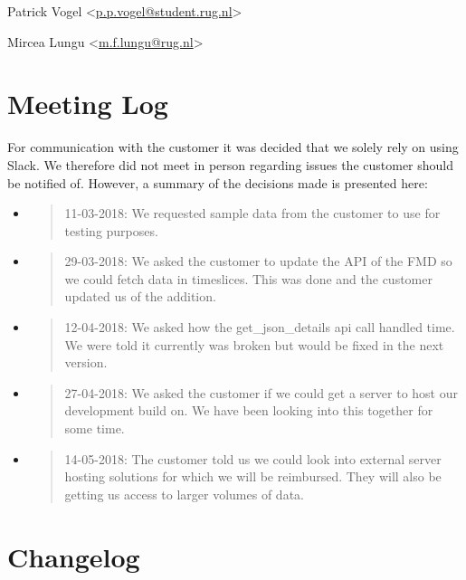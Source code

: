 Patrick Vogel
\textless{}\href{mailto:p.p.vogel@student.rug.nl}{{p.p.vogel@student.rug.nl}}\textgreater{}

Mircea Lungu
\textless{}\href{mailto:m.f.lungu@rug.nl}{{m.f.lungu@rug.nl}}\textgreater{}

\hypertarget{meeting-log}{%
\section{Meeting Log}\label{meeting-log}}

For communication with the customer it was decided that we solely rely
on using Slack. We therefore did not meet in person regarding issues the
customer should be notified of. However, a summary of the decisions made
is presented here:

\begin{itemize}
\item
  \begin{quote}
  11-03-2018: We requested sample data from the customer to use for
  testing purposes.
  \end{quote}
\item
  \begin{quote}
  29-03-2018: We asked the customer to update the API of the FMD so we
  could fetch data in timeslices. This was done and the customer updated
  us of the addition.
  \end{quote}
\item
  \begin{quote}
  12-04-2018: We asked how the get\_json\_details api call handled time.
  We were told it currently was broken but would be fixed in the next
  version.
  \end{quote}
\item
  \begin{quote}
  27-04-2018: We asked the customer if we could get a server to host our
  development build on. We have been looking into this together for some
  time.
  \end{quote}
\item
  \begin{quote}
  14-05-2018: The customer told us we could look into external server
  hosting solutions for which we will be reimbursed. They will also be
  getting us access to larger volumes of data.
  \end{quote}
\end{itemize}

\hypertarget{changelog}{%
\section{Changelog}\label{changelog}}

